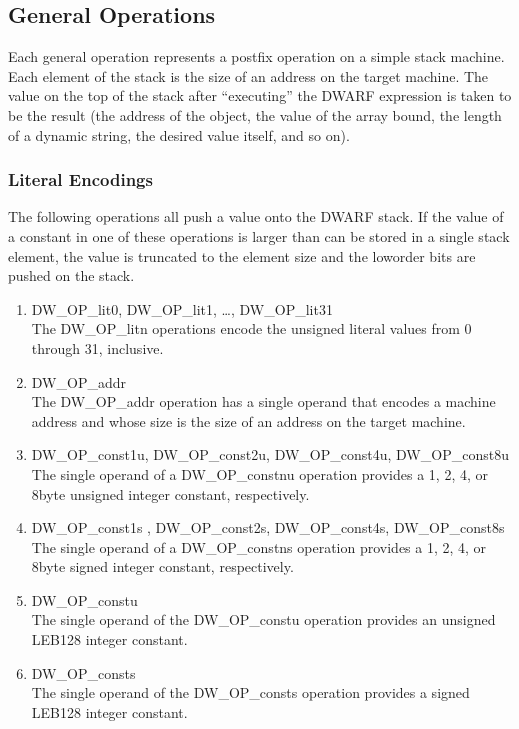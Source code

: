 \subsection{General Operations}
\label{chap:generaloperations}
Each general operation represents a postfix operation on
a simple stack machine. Each element of the stack is the
size of an address on the target machine. The value on the
top of the stack after ``executing'' the DWARF expression
is taken to be the result (the address of the object, the
value of the array bound, the length of a dynamic string,
the desired value itself, and so on).

\subsubsection{Literal Encodings}
\label{chap:literalencodings}
The following operations all push a value onto the DWARF
stack. If the value of a constant in one of these operations
is larger than can be stored in a single stack element, the
value is truncated to the element size and the low\dash order bits
are pushed on the stack.

\begin{enumerate}[1]
\item DW\_OP\_lit0, DW\_OP\_lit1, \dots, DW\_OP\_lit31 \\
The DW\_OP\_litn operations encode the unsigned literal values
from 0 through 31, inclusive.

\item DW\_OP\_addr \\
The DW\_OP\_addr operation has a single operand that encodes
a machine address and whose size is the size of an address
on the target machine.

\item DW\_OP\_const1u, DW\_OP\_const2u, DW\_OP\_const4u, DW\_OP\_const8u \\
The single operand of a DW\_OP\_constnu operation provides a 1,
2, 4, or 8\dash byte unsigned integer constant, respectively.

\item DW\_OP\_const1s , DW\_OP\_const2s, DW\_OP\_const4s, DW\_OP\_const8s \\
The single operand of a DW\_OP\_constns operation provides a 1,
2, 4, or 8\dash byte signed integer constant, respectively.

\item DW\_OP\_constu \\
The single operand of the DW\_OP\_constu operation provides
an unsigned LEB128 integer constant.

\item DW\_OP\_consts \\
The single operand of the DW\_OP\_consts operation provides
a signed LEB128 integer constant.

\end{enumerate}


